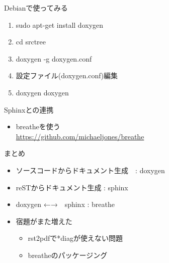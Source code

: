 \begin{frame}{Debianで使ってみる}
 \begin{enumerate}
  \item sudo apt-get install doxygen
  \item cd srctree
  \item doxygen -g doxygen.conf
  \item 設定ファイル(doxygen.conf)編集
  \item doxygen doxygen
 \end{enumerate}
\end{frame}

\begin{frame}{Sphinxとの連携}
 \begin{itemize}
  \item breatheを使う\\
	\url{https://github.com/michaeljones/breathe}
 \end{itemize}
\end{frame}

\begin{frame}{まとめ}
 \begin{itemize}
  \item ソースコードからドキュメント生成　: doxygen
  \item reSTからドキュメント生成 : sphinx
  \item doxygen ←→　sphinx : breathe
  \item 宿題がまた増えた
	\begin{itemize}
	 \item rst2pdfで*diagが使えない問題
	 \item breatheのパッケージング
	\end{itemize}
 \end{itemize}
\end{frame}


